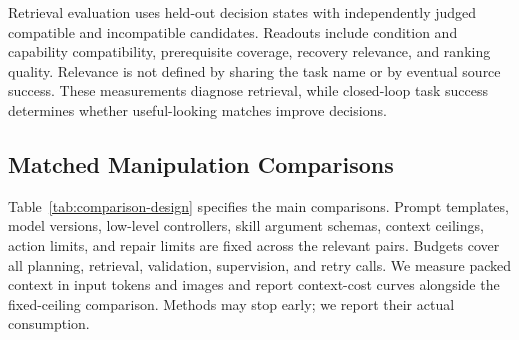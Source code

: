 \documentclass[10pt,twocolumn,letterpaper]{article}
\begin{document}
Retrieval evaluation uses held-out decision states with independently judged compatible and incompatible candidates. Readouts include condition and capability compatibility, prerequisite coverage, recovery relevance, and ranking quality. Relevance is not defined by sharing the task name or by eventual source success. These measurements diagnose retrieval, while closed-loop task success determines whether useful-looking matches improve decisions.

\subsection{Matched Manipulation Comparisons}

Table~\ref{tab:comparison-design} specifies the main comparisons. Prompt templates, model versions, low-level controllers, skill argument schemas, context ceilings, action limits, and repair limits are fixed across the relevant pairs. Budgets cover all planning, retrieval, validation, supervision, and retry calls. We measure packed context in input tokens and images and report context-cost curves alongside the fixed-ceiling comparison. Methods may stop early; we report their actual consumption.
\end{document}
